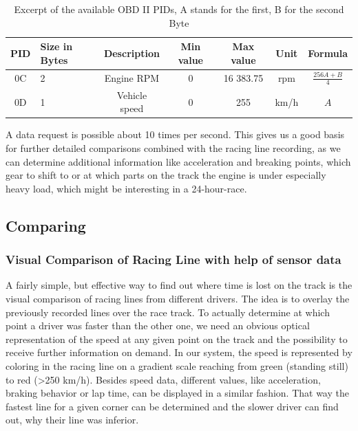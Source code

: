 \begin{table}[!ht]
	\begin{center}
		\begin{tabularx}{\textwidth}{|c | X | c | c | c | c | c |}
			\hline
			PID & Size in Bytes & Description & Min value & Max value & Unit & Formula\\ \hline
			0C & 2 & Engine RPM & 0 & 16 383.75 & rpm & $\frac{256A + B}{4}$\\ \hline
			0D & 1 & Vehicle speed & 0 & 255 & km/h & $A$\\ \hline
		\end{tabularx}
	\end{center}
	\caption{Excerpt of the available OBD II PIDs, A stands for the first, B for the second Byte}
\end{table}

A data request is possible about 10 times per second. This gives us a good basis for further detailed comparisons combined with the racing line recording, as we can determine additional information like acceleration and breaking points, which gear to shift to or at which parts on the track the engine is under especially heavy load, which might be interesting in a 24-hour-race.

\subsection{Comparing}
\subsubsection{Visual Comparison of Racing Line with help of sensor data}
A fairly simple, but effective way to find out where time is lost on the track is the visual comparison of racing lines from different drivers. The idea is to overlay the previously recorded lines over the race track. To actually determine at which point a driver was faster than the other one, we need an obvious optical representation of the speed at any given point on the track and the possibility to receive further information on demand.
In our system, the speed is represented by coloring in the racing line on a gradient scale reaching from green (standing still) to red (>250 km/h).
Besides speed data, different values, like acceleration, braking behavior or lap time, can be displayed in a similar fashion. That way the fastest line for a given corner can be determined and the slower driver can find out, why their line was inferior.


